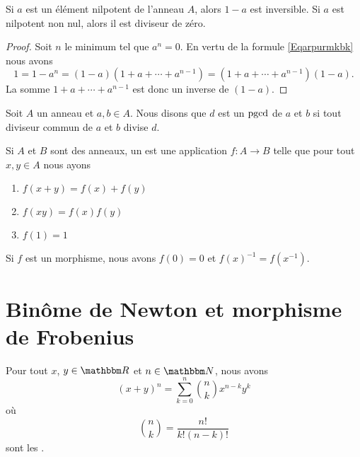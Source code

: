 \begin{proposition}
    Si \( a\) est un élément nilpotent de l'anneau \( A\), alors \( 1-a\) est inversible. Si \( a\) est nilpotent non nul, alors il est diviseur de zéro.
\end{proposition}

\begin{proof}
    Soit \( n\) le minimum tel que \( a^n=0\). En vertu de la formule \eqref{Eqarpurmkbk} nous avons
    \begin{equation}
        1=1-a^n=(1-a)(1+a+\cdots+a^{n-1})=(1+a+\cdots+a^{n-1})(1-a).
    \end{equation}
    La somme \( 1+a+\cdots+a^{n-1}\) est donc un inverse de \( (1-a)\).
\end{proof}

\begin{definition}
    Soit \( A\) un anneau et \( a,b\in A\). Nous disons que \( d\) est un \( \operatorname{pgcd}\) de \( a\) et \( b\) si tout diviseur commun de \( a\) et \( b\) divise \( d\).
\end{definition}

\begin{definition}
    Si \( A\) et \( B\) sont des anneaux, un  est une application \( f\colon A\to B\) telle que pour tout \( x,y\in A\) nous ayons
    \begin{enumerate}
        \item
            \( f(x+y)=f(x)+f(y)\)
        \item
            \( f(xy)=f(x)f(y)\)
        \item
            \( f(1)=1\)
    \end{enumerate}
\end{definition}

Si \( f\) est un morphisme, nous avons \( f(0)=0\) et \( f(x)^{-1}=f(x^{-1})\).

\section{Binôme de Newton et morphisme de Frobenius}

\begin{proposition}     \label{PropBinomFExOiL}
Pour tout $x$, $y\in\eR$ et $n\in\eN$, nous avons
\begin{equation}        \label{EqNewtonB}
    (x+y)^n=\sum_{k=0}^n{n\choose k}x^{n-k}y^k
\end{equation}
où
\begin{equation}
    {n\choose k}=\frac{ n! }{ k!(n-k)! }
\end{equation}
sont les .
\end{proposition}

